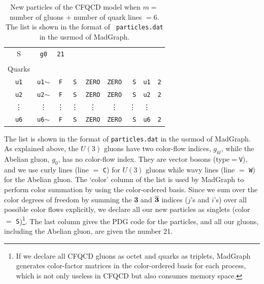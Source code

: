 \documentclass[a4paper,11pt]{article}
\begin{document}
\begin{table}
\begin{center}
\begin{tabular}{ccccccccc}
{			 S}&{\tt g0}&{\tt 21}\\\\
Quarks\\
{\tt u1}&{\tt u1{\footnotesize $\sim$}}& {\tt F}&{\tt S}& {\tt ZERO} &{\tt ZERO}&{\tt
			 S}&{\tt u1}&{\tt 2}\\
{\tt u2}&{\tt u2{\footnotesize $\sim$}}& {\tt F}&{\tt S}& {\tt ZERO} &{\tt ZERO}&{\tt
			 S}&{\tt u2}&{\tt 2}\\
\vdots&\vdots&\vdots&\vdots&\vdots&\vdots&\vdots&\vdots&\\
{\tt u6}&{\tt u6{\footnotesize $\sim$}}& {\tt F}&{\tt S}& {\tt ZERO} &{\tt ZERO}&{\tt
			 S}&{\tt u6}&{\tt 2}\\
\hline\hline
\end{tabular}
\caption{New particles of the CFQCD model when $m =$ number of gluons
 $+$ number of quark lines $=6$. The list is shown in the format of {\tt
 particles.dat} in the usrmod of MadGraph\cite{MG/ME}.}
\label{tb:particles}
\end{center}
\end{table}
 The list is shown in the format of
{\tt particles.dat} in the usrmod of MadGraph\cite{MG/ME}. As
explained above, the $U(3)$ gluons have two color-flow indices,
$g_{kl}$,
while the Abelian gluon, $g_0$, has no
color-flow index. They are vector bosons (type$=${\tt V}), and we use
curly lines (line $=$ {\tt C}) for $U(3)$ gluons while wavy lines (line
$=$ {\tt W}) for the Abelian gluon. The `color' column of the list is
used by MadGraph to perform color summation by using the color-ordered
basis. Since we sum over the color degrees of freedom by summing the {\bf
3} and $\overline{{\bf 3}}$ indices ($j$'s and $i$'s) over all possible color
flows explicitly, we declare all our new particles as singlets (color
$=$ {\tt S})\footnote{If we declare all CFQCD gluons as octet and
quarks as triplets, MadGraph generates color-factor matrices in the
color-ordered basis for each
process, which is not only useless in CFQCD but also consumes memory space.}.
The last column gives the PDG code for the particles, and
all our gluons, including the Abelian gluon, are given the number 21.
\end{document}
